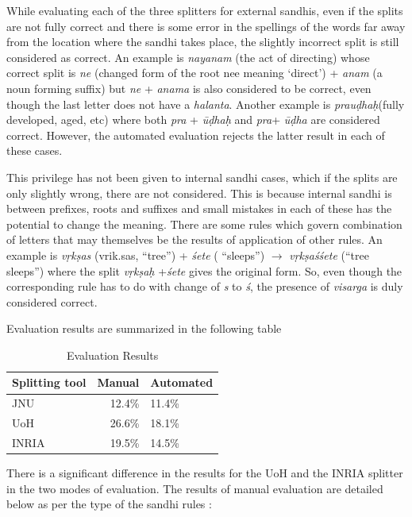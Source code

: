 \documentclass[11pt]{article}
\begin{document}
While evaluating each of the three splitters for external sandhis, even if the splits are not fully correct and there is some error in the spellings of the words far away from the location where the sandhi takes place, the slightly incorrect split is still considered as correct. An example is \textit{nayanam} (the act of directing)  whose correct split is \textit{ne} (changed form of the root nee meaning ‘direct’) + \textit{anam} (a noun forming suffix)  but \textit{ne}  + \textit{anama} is also considered to be correct, even though the last letter does not have a \textit{halanta}.  Another example is \textit{prau\d{d}ha\d{h}}(fully developed, aged, etc) where both \textit{pra} + \textit{\={u}\d{d}ha\d{h}}  and \textit{pra}+ \textit{\={u}\d{d}ha} are considered correct.  However, the automated evaluation rejects the latter result in each of these cases.


This privilege has not been given to internal sandhi cases, which if the splits are only slightly wrong, there are not considered.  This is because internal sandhi is between prefixes, roots and suffixes and small mistakes in each of these has the potential to change the meaning.
There are some rules which govern combination of letters that may themselves be the results of application of other rules. An example is \textit{v\d{r}k\d{s}as }(vrik.sas, “tree”) + \textit{\'{s}ete} ( ``sleeps'') $\rightarrow$ \textit{v\d{r}k\d{s}a\'{s}\'{s}ete} (``tree sleeps'') where the split \textit{v\d{r}k\d{s}a\d{h} } +\textit{\'{s}ete}  gives the original form. So, even though the corresponding rule has to do with change of \textit{s} to\textit{ \'{s}}, the presence of \textit{visarga} is duly considered correct.

Evaluation results are summarized in the following table

\begin{table}[h]
\begin{center}
\begin{tabular}{|l|rl|}
\hline \bf Splitting tool & \bf Manual \bf & Automated \\ \hline
JNU&12.4\%&11.4\% \\
UoH&26.6\%&18.1\% \\
INRIA&19.5\%&14.5\% \\
\hline
\end{tabular}
\end{center}
\caption{\label{font-table} Evaluation Results }
\end{table}

There is a significant difference in the results for the UoH and the INRIA splitter in the two modes of evaluation. The results of manual evaluation are detailed below as per the type of the sandhi rules :
\end{document}
